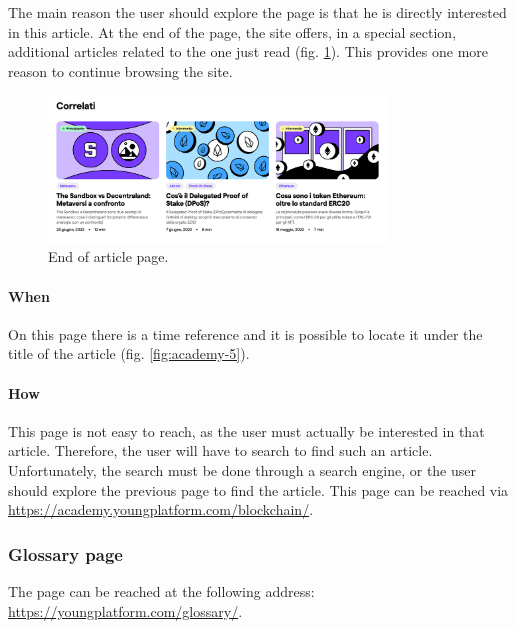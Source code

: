 The main reason the user should explore the page is that he is directly 
interested in this article. At the end of the page, the site offers, in a 
special section, additional articles related to the one just read 
(fig. \ref{fig:academy-7}). This provides one more reason to continue 
browsing the site.

\begin{figure}[H]
  \centering
  \includegraphics[width=0.80\textwidth]{res/images/internal-pages/academy/academy-7.png}
  \caption{End of article page.}
  \label{fig:academy-7}
\end{figure}

\paragraph{When}

On this page there is a time reference and it is possible to locate it 
under the title of the article (fig. \ref{fig:academy-5}).

\paragraph{How}

This page is not easy to reach, as the user must actually be interested in 
that article. Therefore, the user will have to search to find such an 
article. Unfortunately, the search must be done through a search engine, 
or the user should explore the previous page to find the article. This 
page can be reached via 
\href{https://academy.youngplatform.com/blockchain/}{https://academy.youngplatform.com/blockchain/}.

\subsubsection{Glossary page}

The page can be reached at the following address: 
\href{https://youngplatform.com/glossary/}{https://youngplatform.com/glossary/}.

